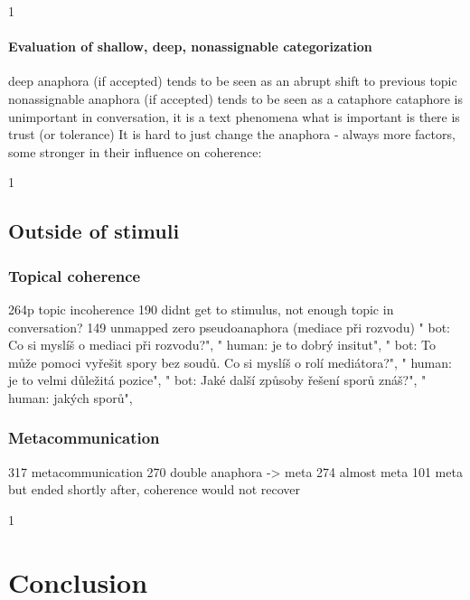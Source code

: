 1
\paragraph{Evaluation of shallow, deep, nonassignable categorization}
deep anaphora (if accepted) tends to be seen as an abrupt shift to previous topic
nonassignable anaphora (if accepted) tends to be seen as a cataphore
    cataphore is unimportant in conversation, it is a text phenomena
    what is important is there is trust (or tolerance)
		It is hard to just change the anaphora - always more factors, some stronger in their influence on coherence:

1
\subsection{Outside of stimuli}

\subsubsection{Topical coherence}
    264p topic incoherence
    190 didnt get to stimulus, not enough topic in conversation?
    149 unmapped zero pseudoanaphora (mediace při rozvodu)
    " bot: Co si myslíš o mediaci při rozvodu?",
    " human: je to dobrý insitut",
    " bot: To může pomoci vyřešit spory bez soudů. Co si myslíš o rolí mediátora?",
    " human: je to velmi důležitá pozice",
    " bot: Jaké další způsoby řešení sporů znáš?",
    " human: jakých sporů",

\subsubsection{Metacommunication}
    317 metacommunication
    270 double anaphora -> meta
    274 almost meta
    101 meta but ended shortly after, coherence would not recover


1
\section{Conclusion}
